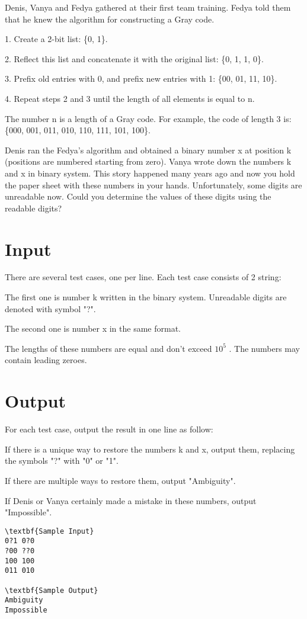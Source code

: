 

Denis, Vanya and Fedya gathered at their first team training. Fedya told them that he knew the algorithm for constructing a Gray code.

1. Create a 2-bit list: \{0, 1\}.

2. Reflect this list and concatenate it with the original list: \{0, 1, 1, 0\}.

3. Prefix old entries with 0, and prefix new entries with 1: \{00, 01, 11, 10\}.

4. Repeat steps 2 and 3 until the length of all elements is equal to n.

The number n is a length of a Gray code. For example, the code of length 3 is: \{000, 001, 011, 010, 110, 111, 101, 100\}.

Denis ran the Fedya's algorithm and obtained a binary number x at position k (positions are numbered starting from zero). Vanya wrote down the numbers k and x in binary system. This story happened many years ago and now you hold the paper sheet with these numbers in your hands. Unfortunately, some digits are unreadable now. Could you determine the values of these digits using the readable digits?

\section{Input}

There are several test cases, one per line. Each test case consists of 2 string:

The first one is number k written in the binary system. Unreadable digits are denoted with symbol "?".

The second one is number x in the same format.

The lengths of these numbers are equal and don't exceed $10^{5}$ . The numbers may contain leading zeroes.

\section{Output}

For each test case, output the result in one line as follow:

If there is a unique way to restore the numbers k and x, output them, replacing the symbols "?" with "0" or "1".

If there are multiple ways to restore them, output "Ambiguity".

If Denis or Vanya certainly made a mistake in these numbers, output "Impossible".
\begin{verbatim}
\textbf{Sample Input}
0?1 0?0
?00 ??0
100 100
011 010

\textbf{Sample Output}
Ambiguity
Impossible\end{verbatim}
